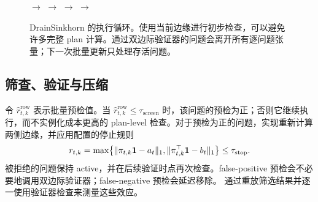 \begin{figure}[t]
\centering
\setlength{\fboxsep}{6pt}
\hspace{2pt}$\rightarrow$\hspace{2pt}
\hspace{2pt}$\rightarrow$\hspace{2pt}
\hspace{2pt}$\rightarrow$\hspace{2pt}
\hspace{2pt}$\rightarrow$\hspace{2pt}
\caption{DrainSinkhorn 的执行循环。使用当前边缘进行初步检查，可以避免许多完整 plan 计算。通过双边际验证器的问题会离开所有逐问题张量；下一次批量更新只处理存活问题。}
\label{fig:active-loop}
\end{figure}

\subsection{筛查、验证与压缩}

令 $\widehat r^{\mathrm{row}}_{t,k}$ 表示批量预检值。当 $\widehat r^{\mathrm{row}}_{t,k}\leq\tau_{\mathrm{screen}}$ 时，该问题的预检为正；否则它继续执行，而不实例化成本更高的 plan-level 检查。对于预检为正的问题，实现重新计算两侧边缘，并应用配置的停止规则
\begin{equation}
r_{t,k}=\max\!\left\{
\|\pi_{t,k}\mathbf{1}-a_t\|_1,
\|\pi_{t,k}^\top\mathbf{1}-b_t\|_1
\right\}\leq\tau_{\mathrm{stop}}.
\label{eq:release-contract}
\end{equation}
被拒绝的问题保持 active，并在后续验证时点再次检查。false-positive 预检会不必要地调用双边际验证器；false-negative 预检会延迟移除。 通过重放筛选结果并逐一使用验证器检查来测量这些效应。

